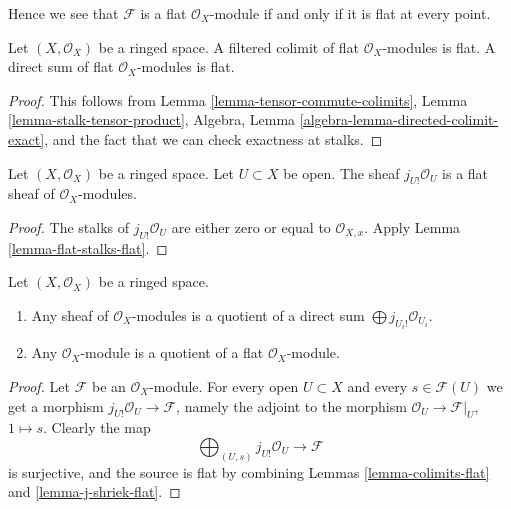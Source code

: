 \noindent
Hence we see that $\mathcal{F}$ is a flat $\mathcal{O}_X$-module
if and only if it is flat at every point.

\begin{lemma}
\label{lemma-colimits-flat}
Let $(X, \mathcal{O}_X)$ be a ringed space.
A filtered colimit of flat $\mathcal{O}_X$-modules is flat.
A direct sum of flat $\mathcal{O}_X$-modules is flat.
\end{lemma}

\begin{proof}
This follows from
Lemma \ref{lemma-tensor-commute-colimits},
Lemma \ref{lemma-stalk-tensor-product},
Algebra, Lemma \ref{algebra-lemma-directed-colimit-exact},
and the fact that we can check exactness at stalks.
\end{proof}

\begin{lemma}
\label{lemma-j-shriek-flat}
Let $(X, \mathcal{O}_X)$ be a ringed space.
Let $U \subset X$ be open. The sheaf $j_{U!}\mathcal{O}_U$
is a flat sheaf of $\mathcal{O}_X$-modules.
\end{lemma}

\begin{proof}
The stalks of $j_{U!}\mathcal{O}_U$ are either zero or equal
to $\mathcal{O}_{X, x}$. Apply
Lemma \ref{lemma-flat-stalks-flat}.
\end{proof}

\begin{lemma}
\label{lemma-module-quotient-flat}
Let $(X, \mathcal{O}_X)$ be a ringed space.
\begin{enumerate}
\item Any sheaf of $\mathcal{O}_X$-modules is a quotient of
a direct sum $\bigoplus j_{U_i!}\mathcal{O}_{U_i}$.
\item Any $\mathcal{O}_X$-module is a quotient of
a flat $\mathcal{O}_X$-module.
\end{enumerate}
\end{lemma}

\begin{proof}
Let $\mathcal{F}$ be an $\mathcal{O}_X$-module.
For every open $U \subset X$ and every
$s \in \mathcal{F}(U)$ we get a morphism
$j_{U!}\mathcal{O}_U \to \mathcal{F}$, namely the adjoint to
the morphism $\mathcal{O}_U \to \mathcal{F}|_U$, $1 \mapsto s$.
Clearly the map
$$
\bigoplus\nolimits_{(U, s)} j_{U!}\mathcal{O}_U
\longrightarrow
\mathcal{F}
$$
is surjective, and the source is flat by combining Lemmas
\ref{lemma-colimits-flat} and \ref{lemma-j-shriek-flat}.
\end{proof}

